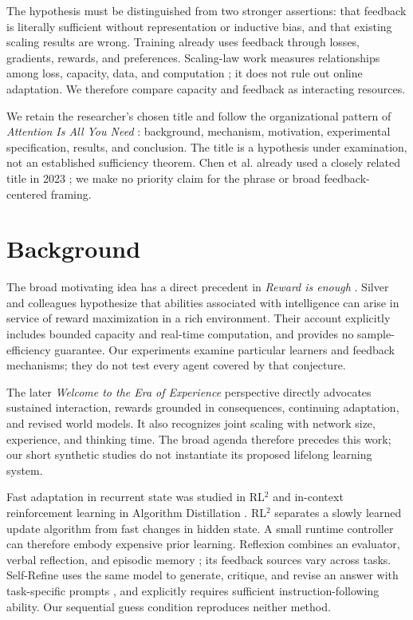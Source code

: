 \documentclass[11pt]{article}
\begin{document}
The hypothesis must be distinguished from two stronger assertions: that
feedback is literally sufficient without representation or inductive bias,
and that existing scaling results are wrong. Training already uses feedback
through losses, gradients, rewards, and preferences. Scaling-law work measures
relationships among loss, capacity, data, and computation \cite{kaplan,hoffmann};
it does not rule out online adaptation. We therefore compare capacity and
feedback as interacting resources.

We retain the researcher's chosen title and follow the organizational pattern
of \emph{Attention Is All You Need} \cite{vaswani}: background, mechanism,
motivation, experimental specification, results, and conclusion. The title is
a hypothesis under examination, not an established sufficiency theorem.
Chen et al. already used a closely related title in 2023 \cite{chen}; we make
no priority claim for the phrase or broad feedback-centered framing.

\section{Background}
The broad motivating idea has a direct precedent in \emph{Reward is enough}
\cite{silver}. Silver and colleagues hypothesize that abilities associated with
intelligence can arise in service of reward maximization in a rich environment.
Their account explicitly includes bounded capacity and real-time computation,
and provides no sample-efficiency guarantee. Our experiments examine particular
learners and feedback mechanisms; they do not test every agent covered by that
conjecture.

The later \emph{Welcome to the Era of Experience} perspective \cite{experience}
directly advocates sustained interaction, rewards grounded in consequences,
continuing adaptation, and revised world models. It also recognizes joint
scaling with network size, experience, and thinking time. The broad agenda
therefore precedes this work; our short synthetic studies do not instantiate
its proposed lifelong learning system.

Fast adaptation in recurrent state was studied in RL$^2$ \cite{duan} and
in-context reinforcement learning in Algorithm Distillation \cite{laskin}.
RL$^2$ separates a slowly learned update algorithm from fast changes in hidden
state. A small runtime controller can therefore embody expensive prior learning.
Reflexion combines an evaluator, verbal reflection, and episodic memory
\cite{shinn}; its feedback sources vary across tasks. Self-Refine uses the same
model to generate, critique, and revise an answer with task-specific prompts
\cite{madaan}, and explicitly requires sufficient instruction-following ability.
Our sequential guess condition reproduces neither method.
\end{document}
